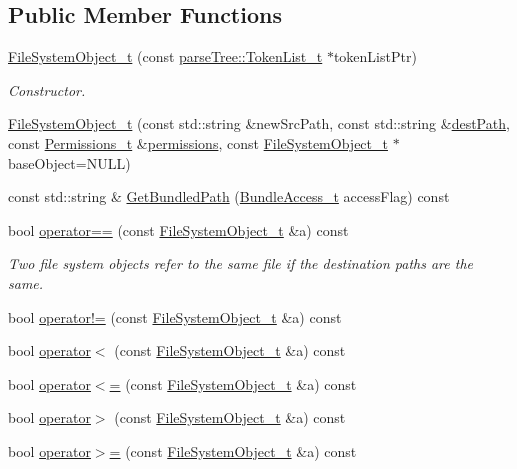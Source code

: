 \subsection*{Public Member Functions}
\begin{DoxyCompactItemize}
\item 
\hyperlink{struct_file_system_object__t_ad3feba22345d5ec40a0609e72ac42d4f}{File\+System\+Object\+\_\+t} (const \hyperlink{structparse_tree_1_1_token_list__t}{parse\+Tree\+::\+Token\+List\+\_\+t} $\ast$token\+List\+Ptr)
\begin{DoxyCompactList}\small\item\em Constructor. \end{DoxyCompactList}\item 
\hyperlink{struct_file_system_object__t_ae1bc88f61f48108c9eb66c1ea2a3396a}{File\+System\+Object\+\_\+t} (const std\+::string \&new\+Src\+Path, const std\+::string \&\hyperlink{struct_file_system_object__t_ac6dbb0856dbd74ac66c3f14436363b79}{dest\+Path}, const \hyperlink{struct_permissions__t}{Permissions\+\_\+t} \&\hyperlink{struct_file_system_object__t_a04b6bf4dfc13dd1e46bf5b944eb1d795}{permissions}, const \hyperlink{struct_file_system_object__t}{File\+System\+Object\+\_\+t} $\ast$base\+Object=N\+U\+LL)
\item 
const std\+::string \& \hyperlink{struct_file_system_object__t_a4cc4da8ef6b32c2f8e7af98894be942e}{Get\+Bundled\+Path} (\hyperlink{file_system_object_8h_ad45d21047cc8ef9953d374d324715d08}{Bundle\+Access\+\_\+t} access\+Flag) const 
\item 
bool \hyperlink{struct_file_system_object__t_acc2d7fd59c015679de1553d609828bd6}{operator==} (const \hyperlink{struct_file_system_object__t}{File\+System\+Object\+\_\+t} \&a) const 
\begin{DoxyCompactList}\small\item\em Two file system objects refer to the same file if the destination paths are the same. \end{DoxyCompactList}\item 
bool \hyperlink{struct_file_system_object__t_a1dbbcc89d36866d3cec79d68fb9fde6c}{operator!=} (const \hyperlink{struct_file_system_object__t}{File\+System\+Object\+\_\+t} \&a) const 
\item 
bool \hyperlink{struct_file_system_object__t_a3ce7a19a1a0e85260626b00be2d5ff6d}{operator$<$} (const \hyperlink{struct_file_system_object__t}{File\+System\+Object\+\_\+t} \&a) const 
\item 
bool \hyperlink{struct_file_system_object__t_ac9f6ad2d48f134fb03d29bb6e6731c6c}{operator$<$=} (const \hyperlink{struct_file_system_object__t}{File\+System\+Object\+\_\+t} \&a) const 
\item 
bool \hyperlink{struct_file_system_object__t_a279f0c82e906f7df9a7caa7db4bd2d08}{operator$>$} (const \hyperlink{struct_file_system_object__t}{File\+System\+Object\+\_\+t} \&a) const 
\item 
bool \hyperlink{struct_file_system_object__t_ad55b22107e052a62928523aefb0b83ea}{operator$>$=} (const \hyperlink{struct_file_system_object__t}{File\+System\+Object\+\_\+t} \&a) const 
\end{DoxyCompactItemize}
